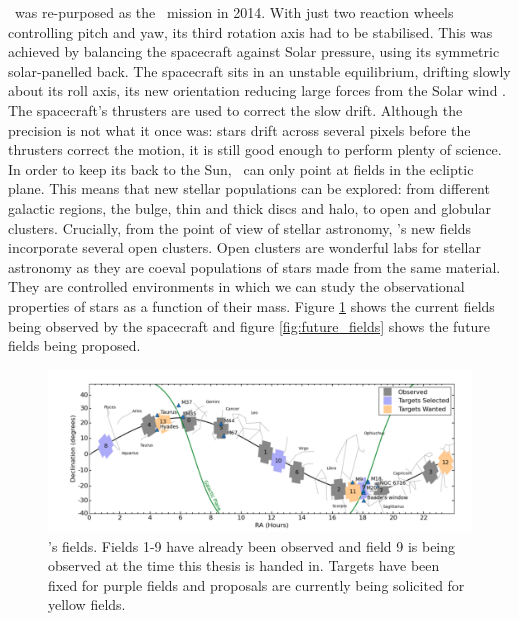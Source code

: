 \kepler\ was re-purposed as the \ktwo\ mission in 2014.
With just two reaction wheels controlling pitch and yaw, its third rotation
axis had to be stabilised.
This was achieved by balancing the spacecraft against Solar pressure, using
its symmetric solar-panelled back.
The spacecraft sits in an unstable equilibrium, drifting slowly about its roll
axis, its new orientation reducing large forces from the Solar wind
\citep{Howell2014}.
The spacecraft's thrusters are used to correct the slow drift.
Although the precision is not what it once was: stars drift across several
pixels before the thrusters correct the motion, it is still good enough to
perform plenty of science.
In order to keep its back to the Sun, \kepler\ can only point at fields in the
ecliptic plane.
This means that new stellar populations can be explored: from different
galactic regions, the bulge, thin and thick discs and halo, to open and
globular clusters.
Crucially, from the point of view of stellar astronomy, \kepler's new fields
incorporate several open clusters.
Open clusters are wonderful labs for stellar astronomy as they are coeval
populations of stars made from the same material.
They are controlled environments in which we can study the observational
properties of stars as a function of their mass.
Figure \ref{fig:current_fields} shows the current fields being observed by the
spacecraft and figure \ref{fig:future_fields} shows the future fields being
proposed.

\begin{figure}[p]
\begin{center}
\includegraphics[width=6in, clip=true]{figures/Current_K2_fields.pdf}
\caption[Current \ktwo\ fields]{\ktwo's fields. Fields 1-9 have already been
observed and field 9 is being observed at the time this thesis is handed in.
Targets have been fixed for purple fields and proposals are currently being
solicited for yellow fields.}
\label{fig:current_fields}
\end{center}
\end{figure}

